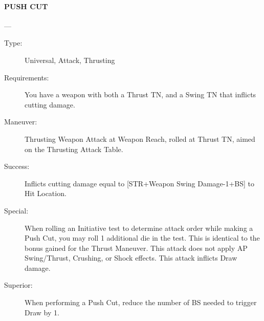 \documentclass[oneside,11pt,english]{book}
\begin{document}
\paragraph{\large\label{man:PUSH CUT} PUSH CUT}---\quad{\large[X+1]}
\vspace{-10pt}\begin{description} 
\item [Type:] Universal, Attack, Thrusting 
\item [Requirements:] You have a weapon with both a Thrust TN, and a Swing TN that inflicts cutting damage. 
\item [Maneuver:] Thrusting Weapon Attack at Weapon Reach, rolled at Thrust TN, aimed on the Thrusting 
Attack Table.
\item [Success:] Inflicts cutting damage equal to [STR+Weapon Swing Damage-1+BS] to Hit Location. 
\item [Special:] When rolling an Initiative test to determine attack order while making a Push Cut, you may roll 1 
additional die in the test. This is identical to the bonus gained for the Thrust Maneuver. 
This attack does not apply AP Swing/Thrust, Crushing, or Shock effects. 
This attack inflicts Draw damage. 
\item [Superior:] When performing a Push Cut, reduce the number of BS needed to trigger Draw by 1.
\end{description}
\end{document}
